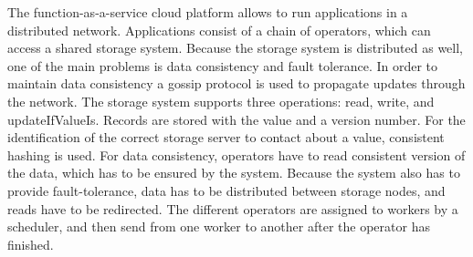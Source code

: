 \documentclass[times, 10pt,twocolumn]{article}
\begin{document}
The function-as-a-service cloud platform allows to run applications in a distributed network.
Applications consist of a chain of operators, which can access a shared storage system.
Because the storage system is distributed as well, one of the main problems is data consistency and fault tolerance.
In order to maintain data consistency a gossip protocol is used to propagate updates through the network.
The storage system supports three operations: read, write, and updateIfValueIs.
Records are stored with the value and a version number.
For the identification of the correct storage server to contact about a value, consistent hashing is used.
For data consistency, operators have to read consistent version of the data, which has to be ensured by the system.
Because the system also has to provide fault-tolerance, data has to be distributed between storage nodes, and reads have to be redirected.
The different operators are assigned to workers by a scheduler, and then send from one worker to another after the operator has finished.












\nocite{ex1,ex2}


\end{document}

